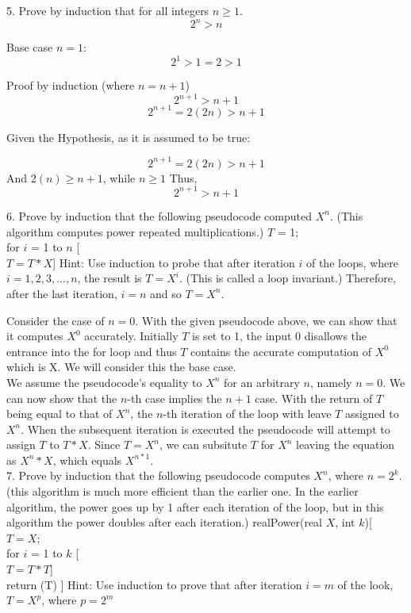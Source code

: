\documentclass[10pt]{article}
\begin{document}
5. Prove by induction that for all integers $n \geq 1$.
$$2^n > n$$

Base case $n = 1$:
$$2^1 > 1 = 2 > 1$$

Proof by induction (where $n = n +1$)
$$2^{n+1} > n + 1$$
$$2^{n+1} = 2(2n) > n+1$$

Given the Hypothesis, as it is assumed to be true:

$$2^{n+1} = 2(2n) > n+1$$
And
\center
$2(n) \geq n + 1$, while $n \geq 1$
\flushleft
Thus,
$$2^{n+1} > n + 1$$

6. Prove by induction that the following pseudocode computed $X^n$. (This algorithm computes power repeated multiplications.) 
\center
$T$ = 1;\\
for $i$ = 1 to $n$ [ \\
$T = T * X$]
\flushleft
Hint: Use induction to probe that after iteration $i$ of the loops, where $i = 1,2,3,...,n$, the result is $T = X^i$.  (This is called a loop invariant.) Therefore, after the last iteration, $i = n$ and so $T = X^n$.

Consider the case of $n = 0$.  With the given pseudocode above, we can show that it computes $X^0$ accurately.  Initially $T$ is set to 1, the input 0 disallows the entrance into the for loop and thus $T$ contains the accurate computation of $X^0$ which is X.  We will consider this the base case.\\

We assume the pseudocode's equality to $X^n$ for an arbitrary $n$, namely $n=0$.  We can now show that the $n$-th case implies the $n+1$ case.  With the return of $T$ being equal to that of $X^n$, the $n$-th iteration of the loop with leave $T$ assigned to $X^n$. When the subsequent iteration is executed the pseudocode will attempt to assign $T$ to $T * X$.  Since $T = X^n$, we can subsitute $T$ for $X^n$ leaving the equation as $X^n * X$, which equals  $X^{n*1}$.\\
 
7. Prove by induction that the following pseudocode computes $X^n$, where $n = 2^k$. (this algorithm is much more efficient than the earlier one.  In the earlier algorithm, the power goes up by 1 after each iteration of the loop, but in this algorithm the power doubles after each iteration.)
\center
realPower(real $X$, int $k$)[\\
$T = X$;\\
for $i$ = 1 to $k$ [\\
$T = T * T$]\\
return (T)
]
\flushleft
Hint: Use induction to prove that after iteration $i = m$ of the look, $T = X^p$, where $p = 2^m$
\end{document}
